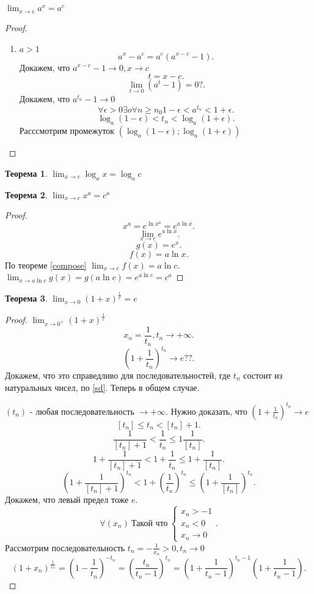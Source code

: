 \documentclass[a4paper]{scrartcl}
\newtheorem{theorem}{Теорема}
\begin{document}
\subsection{}
$\lim_{x \to c} a^x = a^c$
\begin{proof}
	\begin{enumerate}
		\item $a>1$
		      \[
			      a^x - a^c = a^c(a^{x - c} - 1)
			      .\]
		      Докажем, что $a^{x - c} - 1 \to 0, x \to c$
		      \[
			      t = x - c
			      .\]
		      \[
			      \lim_{t \to 0} (a^t - 1) = 0 ?
			      .\]
		      Докажем, что $a^{t_n} - 1 \to 0$
		      \[
			      \forall \epsilon > 0 \exists o \forall n \ge n_0 1 - \epsilon < a^{t_n} < 1 + \epsilon
			      .\]
		      \[
			      \log_a{( 1 - \epsilon )} < t_n < \log_a{( 1 + \epsilon )}
			      .\]
		      Расссмотрим промежуток $(\log_a{( 1 - \epsilon )};\log_a{( 1 + \epsilon )})$
	\end{enumerate}
\end{proof}
\begin{theorem}
	$\lim_{x \to c} \log_a{x} = \log_a{c}$
\end{theorem}
\begin{theorem}
	$\lim_{x \to c} x^a = c^a$
\end{theorem}
\begin{proof}
	\[
		x^a = e^{\ln{x^a}}= e^{a\ln{x}}
		.\]
	\[
		\lim_{x \to c} e^{a\ln{x}}
		.\]
	\[
		g(x) = e^x
		.\]
	\[
		f(x) = a\ln{x}
		.\]
	По теореме \ref{compose} $\lim_{x \to c} f(x) = a \ln{c}$. $\lim_{x \to a\ln{c}} g(x) = g(a\ln{c}) = e^{a\ln{c}} = c^a$
\end{proof}
\begin{theorem}
	$\lim_{x \to 0} (1 + x)^{\frac{1}{x}}  = e$
\end{theorem}
\begin{proof}
	$\lim_{x \to 0^+} (1 + x)^{\frac{1}{x}}$
	\[
		x_n = \frac{1}{t_n}, t_n \to +\infty
		.\]
	\[
		(1 + \frac{1}{t_n})^{t_n} \to e ??
		.\]
	Докажем, что это справедливо для последовательностей, где $t_n$ состоит из натуральных чисел, по \ref{sd}. Теперь в общем случае.

	$(t_n)$ - любая последовательность  $\to +\infty$. Нужно доказать, что  $(1 + \frac{1}{t_n})^{t_n} \to e$
	\[
		[t_n] \le t_n <  [t_n] +1
		.\]
	\[
		\frac{1}{[t_n] + 1} < \frac{1}{t_n} \le  1\frac{1}{[t_n]}
		.\]
	\[
		1 + \frac{1}{[t_n] + 1} < 1 + \frac{1}{t_n} \le  1 + \frac{1}{[t_n]}
		.\]
	\[
		( 1 + \frac{1}{[t_n] + 1} )^{t_n}< 1  + ( \frac{1}{t_n} )^{t_n} \le  (1 +  \frac{1}{[t_n]} )^{t_n}
		.\]
	Докажем, что левый предел тоже $e$.
	\[
		\forall  (x_n) ~\text{Такой что} ~
		\begin{cases}
			x_n > -1 \\
			x_n < 0  \\
			x_n \to 0
		\end{cases}
		.\]
	Рассмотрим последовательность $t_n = -\frac{1}{x_n} > 0, t_n \to 0$
	\[
		(1 + x_n)^{\frac{1}{x_n}} = (1 - \frac{1}{t_n})^{-t_n} =
		(\frac{t_n}{t_n -1} )^{t_n} = (1 + \frac{1}{t_n -1 })^{t_n - 1} (1 +  \frac{1}{t_n - 1})
		.\]
\end{proof}
\end{document}
